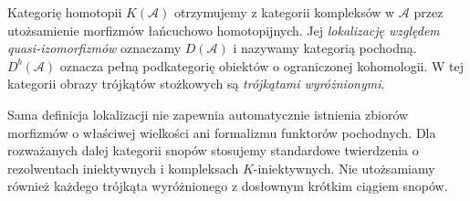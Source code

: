 \begin{definicja}
Kategorię homotopii $K(\mathcal A)$ otrzymujemy z kategorii
kompleksów w $\mathcal A$ przez utożsamienie morfizmów
łańcuchowo homotopijnych. Jej \emph{lokalizację względem
quasi-izomorfizmów} oznaczamy $D(\mathcal A)$ i nazywamy
kategorią pochodną. $D^b(\mathcal A)$ oznacza pełną
podkategorię obiektów o ograniczonej kohomologii.
W tej kategorii obrazy trójkątów stożkowych są
\emph{trójkątami wyróżnionymi}.
\end{definicja}
\begin{uwaga}
Sama definicja lokalizacji nie zapewnia automatycznie
istnienia zbiorów morfizmów o właściwej wielkości ani
formalizmu funktorów pochodnych. Dla rozważanych dalej
kategorii snopów stosujemy standardowe twierdzenia
o rezolwentach iniektywnych i kompleksach $K$-iniektywnych.
Nie utożsamiamy również każdego trójkąta wyróżnionego
z dosłownym krótkim ciągiem snopów.
\end{uwaga}

